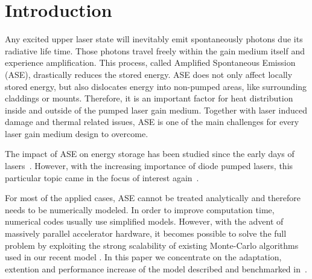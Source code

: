 \section{Introduction}
Any excited upper laser state will inevitably emit spontaneously
photons due its radiative life time. Those photons travel freely
within the gain medium itself and experience amplification.  This
process, called Amplified Spontaneous Emission (ASE), drastically
reduces the stored energy. ASE does not only affect locally stored
energy, but also dislocates energy into non-pumped areas, like
surrounding claddings or mounts. Therefore, it is an important factor
for heat distribution inside and outside of the pumped laser gain
medium. Together with laser induced damage and thermal related issues,
ASE is one of the main challenges for every laser gain medium design
to overcome.

The impact of ASE on energy storage has been studied since the early
days of lasers~\cite{Intro1,Intro2,Intro3}. However, with the
increasing importance of diode pumped lasers, this particular topic
came in the focus of interest again~\cite{Intro4}.

For most of the applied cases, ASE cannot be treated analytically and
therefore needs to be numerically modeled. In order to improve
computation time, numerical codes usually use simplified
models. However, with the advent of massively parallel accelerator
hardware, it becomes possible to solve the full problem by exploiting
the strong scalability of existing Monte-Carlo algorithms used in our
recent model \cite{Intro4}. In this paper we concentrate on the
adaptation, extention and performance increase of the model described
and benchmarked in~\cite{Intro4}.
